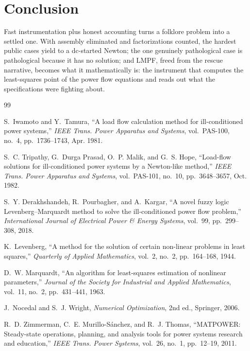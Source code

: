 \documentclass[11pt]{article}
\begin{document}
\section{Conclusion}

Fast instrumentation plus honest accounting turns a folklore problem into a
settled one. With assembly eliminated and factorizations counted, the
hardest public cases yield to a dc-started Newton; the one genuinely
pathological case is pathological because it has no solution; and LMPF,
freed from the rescue narrative, becomes what it mathematically is: the
instrument that computes the least-squares point of the power flow
equations and reads out what the specifications were fighting about.

\begin{thebibliography}{99}

S.~Iwamoto and Y.~Tamura,
``A load flow calculation method for ill-conditioned power systems,''
\emph{IEEE Trans. Power Apparatus and Systems}, vol.~PAS-100, no.~4,
pp.~1736--1743, Apr. 1981.

S.~C. Tripathy, G.~Durga Prasad, O.~P. Malik, and G.~S. Hope,
``Load-flow solutions for ill-conditioned power systems by a Newton-like
method,'' \emph{IEEE Trans. Power Apparatus and Systems}, vol.~PAS-101,
no.~10, pp.~3648--3657, Oct. 1982.

S.~Y. Derakhshandeh, R.~Pourbagher, and A.~Kargar,
``A novel fuzzy logic Levenberg--Marquardt method to solve the
ill-conditioned power flow problem,''
\emph{International Journal of Electrical Power \& Energy Systems},
vol.~99, pp.~299--308, 2018.

K.~Levenberg, ``A method for the solution of certain non-linear problems in
least squares,'' \emph{Quarterly of Applied Mathematics}, vol.~2, no.~2,
pp.~164--168, 1944.

D.~W. Marquardt, ``An algorithm for least-squares estimation of nonlinear
parameters,'' \emph{Journal of the Society for Industrial and Applied
Mathematics}, vol.~11, no.~2, pp.~431--441, 1963.

J.~Nocedal and S.~J. Wright, \emph{Numerical Optimization}, 2nd ed.,
Springer, 2006.

R.~D. Zimmerman, C.~E. Murillo-S\'anchez, and R.~J. Thomas,
``MATPOWER: Steady-state operations, planning, and analysis tools for power
systems research and education,'' \emph{IEEE Trans. Power Systems},
vol.~26, no.~1, pp.~12--19, 2011.


\end{thebibliography}
\end{document}
